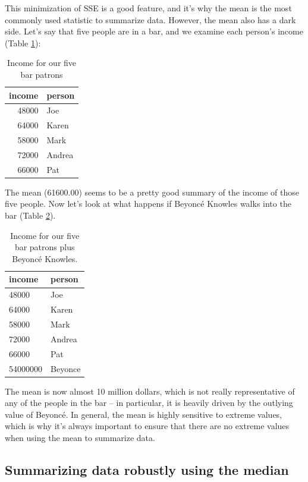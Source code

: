 \documentclass[
  12pt,
]{book}
\begin{document}
This minimization of SSE is a good feature, and it's why the mean is the most commonly used statistic to summarize data. However, the mean also has a dark side. Let's say that five people are in a bar, and we examine each person's income (Table \ref{tab:income1}):

\begin{table}

\caption{\label{tab:income1}Income for our five bar patrons}
\centering
\begin{tabular}[t]{r|l}
\hline
income & person\\
\hline
48000 & Joe\\
\hline
64000 & Karen\\
\hline
58000 & Mark\\
\hline
72000 & Andrea\\
\hline
66000 & Pat\\
\hline
\end{tabular}
\end{table}

The mean (61600.00) seems to be a pretty good summary of the income of those five people. Now let's look at what happens if Beyoncé Knowles walks into the bar (Table \ref{tab:income2}).

\begin{table}

\caption{\label{tab:income2}Income for our five bar patrons plus Beyoncé Knowles.}
\centering
\begin{tabular}[t]{l|l}
\hline
income & person\\
\hline
48000 & Joe\\
\hline
64000 & Karen\\
\hline
58000 & Mark\\
\hline
72000 & Andrea\\
\hline
66000 & Pat\\
\hline
54000000 & Beyonce\\
\hline
\end{tabular}
\end{table}

The mean is now almost 10 million dollars, which is not really representative of any of the people in the bar -- in particular, it is heavily driven by the outlying value of Beyoncé. In general, the mean is highly sensitive to extreme values, which is why it's always important to ensure that there are no extreme values when using the mean to summarize data.

\hypertarget{summarizing-data-robustly-using-the-median}{%
\subsection{Summarizing data robustly using the median}\label{summarizing-data-robustly-using-the-median}}
\end{document}

